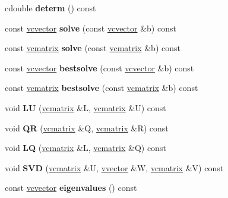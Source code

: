 \begin{DoxyCompactItemize}
\item 
cdouble {\bfseries determ} () const \hypertarget{classvcmatrix_ab45e530dfff06af2d7ede51c3e28abcc}{}\label{classvcmatrix_ab45e530dfff06af2d7ede51c3e28abcc}

\item 
const \hyperlink{classvcvector}{vcvector} {\bfseries solve} (const \hyperlink{classvcvector}{vcvector} \&b) const \hypertarget{classvcmatrix_a5a6a112c69278bd7b54ec4e70a337600}{}\label{classvcmatrix_a5a6a112c69278bd7b54ec4e70a337600}

\item 
const \hyperlink{classvcmatrix}{vcmatrix} {\bfseries solve} (const \hyperlink{classvcmatrix}{vcmatrix} \&b) const \hypertarget{classvcmatrix_af72c864910cc9a08c532bfa1535a76bc}{}\label{classvcmatrix_af72c864910cc9a08c532bfa1535a76bc}

\item 
const \hyperlink{classvcvector}{vcvector} {\bfseries bestsolve} (const \hyperlink{classvcvector}{vcvector} \&b) const \hypertarget{classvcmatrix_a7d9e14966ce7ef7fb0e29d1f14ee5466}{}\label{classvcmatrix_a7d9e14966ce7ef7fb0e29d1f14ee5466}

\item 
const \hyperlink{classvcmatrix}{vcmatrix} {\bfseries bestsolve} (const \hyperlink{classvcmatrix}{vcmatrix} \&b) const \hypertarget{classvcmatrix_a97f0a2828a5c872a8042e0884eb2c852}{}\label{classvcmatrix_a97f0a2828a5c872a8042e0884eb2c852}

\item 
void {\bfseries LU} (\hyperlink{classvcmatrix}{vcmatrix} \&L, \hyperlink{classvcmatrix}{vcmatrix} \&U) const \hypertarget{classvcmatrix_a9b0579de2ffae5c7e8442ccee5d592f2}{}\label{classvcmatrix_a9b0579de2ffae5c7e8442ccee5d592f2}

\item 
void {\bfseries QR} (\hyperlink{classvcmatrix}{vcmatrix} \&Q, \hyperlink{classvcmatrix}{vcmatrix} \&R) const \hypertarget{classvcmatrix_ad38494db0d77a5a2ed196a1de990eb8b}{}\label{classvcmatrix_ad38494db0d77a5a2ed196a1de990eb8b}

\item 
void {\bfseries LQ} (\hyperlink{classvcmatrix}{vcmatrix} \&L, \hyperlink{classvcmatrix}{vcmatrix} \&Q) const \hypertarget{classvcmatrix_a1dd86e60afc3f2c36e203c05db7407d8}{}\label{classvcmatrix_a1dd86e60afc3f2c36e203c05db7407d8}

\item 
void {\bfseries S\+VD} (\hyperlink{classvcmatrix}{vcmatrix} \&U, \hyperlink{classvvector}{vvector} \&W, \hyperlink{classvcmatrix}{vcmatrix} \&V) const \hypertarget{classvcmatrix_a4e2bb1cb7ed9d074c460910546afd05d}{}\label{classvcmatrix_a4e2bb1cb7ed9d074c460910546afd05d}

\item 
const \hyperlink{classvcvector}{vcvector} {\bfseries eigenvalues} () const \hypertarget{classvcmatrix_a477d2c727eaf05c35f205e9e4bb3624b}{}\label{classvcmatrix_a477d2c727eaf05c35f205e9e4bb3624b}

\end{DoxyCompactItemize}
